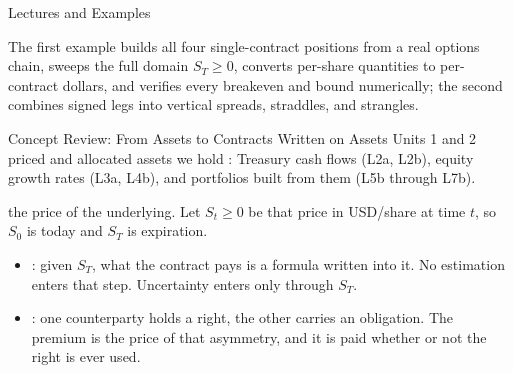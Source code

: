 \documentclass[aspectratio=169,11pt]{beamer}
\newcommand{\ST}{S_{T}}
\begin{document}
\begin{frame}{Lectures and Examples}
  \vspace{0.3em}
  {\normalsize\textbf{}\par
  }

  \vspace{0.6em}
  {\normalsize\textbf{}\par
  }

  \vspace{0.6em}
  {\normalsize\textbf{}\par
  }

  \vspace{0.5em}
  The first example builds all four single-contract positions from a real
  options chain, sweeps the full domain $\ST\geq0$, converts per-share
  quantities to per-contract dollars, and verifies every breakeven and bound
  numerically; the second combines signed legs into vertical spreads,
  straddles, and strangles.
\end{frame}

\begin{frame}{Concept Review: From Assets to Contracts Written on Assets}
  Units 1 and 2 priced and allocated assets we hold : Treasury
  cash flows (L2a, L2b), equity growth rates (L3a, L4b), and portfolios built
  from them (L5b through L7b).

  \vspace{0.4em}
  \textbf{} the price of the underlying. Let $S_t\geq0$ be
  that price in USD/share at time $t$, so $S_0$ is today and $\ST$ is expiration.
  \begin{itemize}\setlength{\itemsep}{0.3em}
    \item {}: given $\ST$, what
      the contract pays is a formula written into it. No estimation enters that
      step. Uncertainty enters only through $\ST$.
    \item {}: one counterparty holds a
      right, the other carries an obligation. The premium is the price of that
      asymmetry, and it is paid whether or not the right is ever used.
  \end{itemize}
\end{frame}
\end{document}
